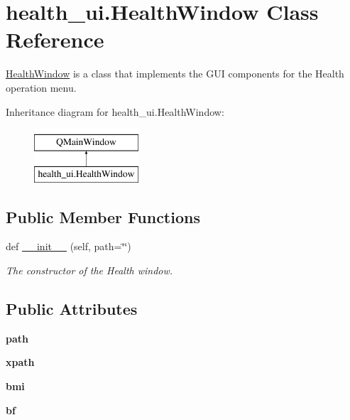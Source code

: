 \hypertarget{classhealth__ui_1_1_health_window}{}\section{health\+\_\+ui.\+Health\+Window Class Reference}
\label{classhealth__ui_1_1_health_window}


\hyperlink{classhealth__ui_1_1_health_window}{Health\+Window} is a class that implements the G\+UI components for the Health operation menu.  


Inheritance diagram for health\+\_\+ui.\+Health\+Window\+:\begin{figure}[H]
\begin{center}
\leavevmode
\includegraphics[height=2.000000cm]{classhealth__ui_1_1_health_window}
\end{center}
\end{figure}
\subsection*{Public Member Functions}
\begin{DoxyCompactItemize}
\item 
def \hyperlink{classhealth__ui_1_1_health_window_aca4eb93be30367445762dc27584bfde5}{\+\_\+\+\_\+init\+\_\+\+\_\+} (self, path=\char`\"{}\char`\"{})
\begin{DoxyCompactList}\small\item\em The constructor of the Health window. \end{DoxyCompactList}\end{DoxyCompactItemize}
\subsection*{Public Attributes}
\begin{DoxyCompactItemize}
\item 
\mbox{\label{classhealth__ui_1_1_health_window_a9b39fd0eb7f740de4266cfcc48110ff8}} 
{\bfseries path}
\item 
\mbox{\label{classhealth__ui_1_1_health_window_a1bb4f7b081abe9c24b6b84b1c3bf3903}} 
{\bfseries xpath}
\item 
\mbox{\label{classhealth__ui_1_1_health_window_ae3cbd4ee473d7a3f02023865dfcbd8c4}} 
{\bfseries bmi}
\item 
\mbox{\label{classhealth__ui_1_1_health_window_a3e1494d47145602a31a0c0bb332690aa}} 
{\bfseries bf}
\end{DoxyCompactItemize}


